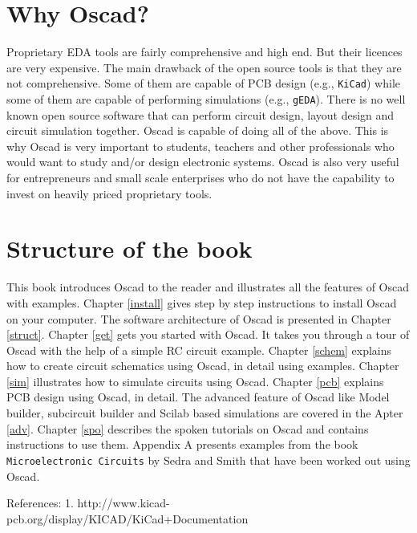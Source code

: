 \section{Why Oscad?}
Proprietary EDA tools are fairly comprehensive and high end. But their licences are very expensive. The main drawback of the open source tools is that they are not comprehensive. Some of them are capable of PCB design (e.g., {\tt KiCad}) while some of them are capable of performing simulations (e.g., {\tt gEDA}). There is no well known open source software that can perform circuit design, layout design and circuit simulation together. Oscad is capable of doing all of the above. This is why Oscad is very important to students, teachers and other professionals who would want to study and/or design electronic systems. Oscad is also very useful for entrepreneurs and small scale enterprises who do not have the capability to invest on heavily priced proprietary tools.
\section{Structure of the book}
This book introduces Oscad to the reader and illustrates all the features of Oscad with examples. Chapter \ref{install} gives step by step instructions to install Oscad on your computer. The software architecture of Oscad is presented in Chapter \ref{struct}. 
 Chapter \ref{get} gets you started with Oscad. It takes you through a tour of Oscad with the help of a simple RC circuit example. Chapter \ref{schem} explains how to create circuit schematics using Oscad, in detail using examples. Chapter \ref{sim} illustrates how to simulate circuits using Oscad. Chapter \ref{pcb} explains PCB design using Oscad, in detail. The advanced feature of Oscad like Model builder, subcircuit builder and Scilab based simulations are covered in the Apter \ref{adv}. Chapter \ref{spo} describes the spoken tutorials on Oscad and contains instructions to use them. Appendix A presents examples from the book {\tt Microelectronic Circuits} by Sedra and Smith that have been worked out using Oscad.





References:
1. http://www.kicad-pcb.org/display/KICAD/KiCad+Documentation



%
